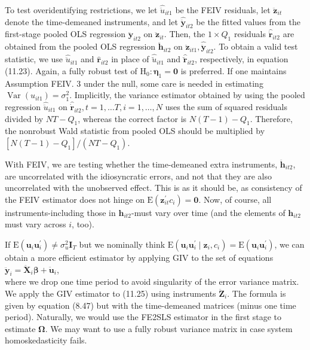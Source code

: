 \documentclass[10pt]{article}
\begin{document}
To test overidentifying restrictions, we let $\hat{\ddot{u}}_{i t 1}$ be the FEIV residuals, let $\ddot{\mathbf{z}}_{i t}$ denote the time-demeaned instruments, and let $\hat{\ddot{\mathbf{y}}}_{i t 2}$ be the fitted values from the first-stage pooled OLS regression $\ddot{\mathbf{y}}_{i t 2}$ on $\ddot{\mathbf{z}}_{i t}$. Then, the $1 \times Q_{1}$ residuals $\hat{\dot{\mathbf{r}}}_{i t 2}$ are obtained from the pooled OLS regression $\ddot{\mathbf{h}}_{i t 2}$ on $\ddot{\mathbf{z}}_{i t 1}, \hat{\ddot{\mathbf{y}}}_{i t 2}$. To obtain a valid test statistic, we use $\hat{\ddot{u}}_{i t 1}$ and $\hat{\mathbf{r}}_{i t 2}$ in place of $\hat{\breve{u}}_{i t 1}$ and $\hat{\breve{\mathbf{r}}}_{i t 2}$, respectively, in equation (11.23). Again, a fully robust test of $\mathrm{H}_{0}: \boldsymbol{\eta}_{1}=\mathbf{0}$ is preferred. If one maintains Assumption FEIV. 3 under the null, some care is needed in estimating $\operatorname{Var}\left(u_{i t 1}\right)=\sigma_{1}^{2}$. Implicitly, the variance estimator obtained by using the pooled regression $\hat{\ddot{u}}_{i t 1}$ on $\hat{\dot{\mathbf{r}}}_{i t 2}, t=1, \ldots T, i=1, \ldots, N$ uses the sum of squared residuals divided by $N T-Q_{1}$, whereas the correct factor is $N(T-1)-Q_{1}$. Therefore, the nonrobust Wald statistic from pooled OLS should be multiplied by $\left[N(T-1)-Q_{1}\right] /\left(N T-Q_{1}\right)$.

With FEIV, we are testing whether the time-demeaned extra instruments, $\ddot{\mathbf{h}}_{i t 2}$, are uncorrelated with the idiosyncratic errors, and not that they are also uncorrelated with the unobserved effect. This is as it should be, as consistency of the FEIV estimator does not hinge on $\mathrm{E}\left(\mathbf{z}_{i t}^{\prime} c_{i}\right)=\mathbf{0}$. Now, of course, all instruments-including those in $\mathbf{h}_{i t 2}$-must vary over time (and the elements of $\mathbf{h}_{i t 2}$ must vary across $i$, too).

If $\mathrm{E}\left(\mathbf{u}_{i} \mathbf{u}_{i}^{\prime}\right) \neq \sigma_{u}^{2} \mathbf{I}_{T}$ but we nominally think $\mathrm{E}\left(\mathbf{u}_{i} \mathbf{u}_{i}^{\prime} \mid \mathbf{z}_{i}, c_{i}\right)=\mathrm{E}\left(\mathbf{u}_{i} \mathbf{u}_{i}^{\prime}\right)$, we can obtain a more efficient estimator by applying GIV to the set of equations\\
$\ddot{\mathbf{y}}_{i}=\ddot{\mathbf{X}}_{i} \boldsymbol{\beta}+\ddot{\mathbf{u}}_{i}$,\\
where we drop one time period to avoid singularity of the error variance matrix. We apply the GIV estimator to (11.25) using instruments $\ddot{\mathbf{Z}}_{i}$. The formula is given by equation (8.47) but with the time-demeaned matrices (minus one time period). Naturally, we would use the FE2SLS estimator in the first stage to estimate $\boldsymbol{\Omega}$. We may want to use a fully robust variance matrix in case system homoskedasticity fails.
\end{document}
